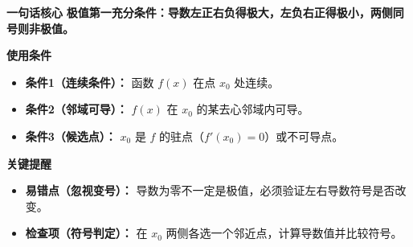 \begin{summarybox}
	\textbf{\textcolor{CSummary}{一句话核心}}
	\textbf{极值第一充分条件：导数左正右负得极大，左负右正得极小，两侧同号则非极值。}

	\medskip
	\textbf{\textcolor{CSummary}{使用条件}}
	\begin{itemize}[leftmargin=*, itemsep=0.5em, topsep=0.4em]
		\item \textbf{条件1（连续条件）：} 函数 $f(x)$ 在点 $x_0$ 处连续。
		\item \textbf{条件2（邻域可导）：} $f(x)$ 在 $x_0$ 的某去心邻域内可导。
		\item \textbf{条件3（候选点）：} $x_0$ 是 $f$ 的驻点（$f'(x_0)=0$）或不可导点。
	\end{itemize}

	\medskip
	\textbf{\textcolor{CSummary}{关键提醒}}
	\begin{itemize}[leftmargin=*, itemsep=0.5em, topsep=0.4em]
		\item \textbf{易错点（忽视变号）：} 导数为零不一定是极值，必须验证左右导数符号是否改变。
		\item \textbf{检查项（符号判定）：} 在 $x_0$ 两侧各选一个邻近点，计算导数值并比较符号。
	\end{itemize}

\end{summarybox}
